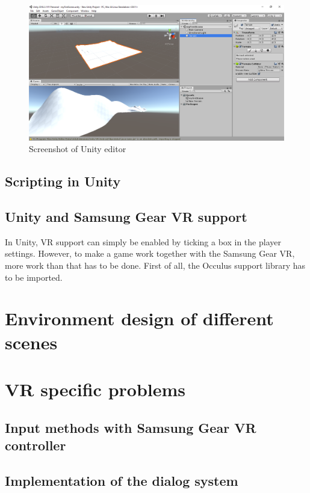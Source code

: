 \begin{figure}[h!]
  \includegraphics[width=16cm]{kapitel/editor.PNG}
  \centering
  \caption{Screenshot of Unity editor}
  \label{fig:unity-editor}
\end{figure}
\subsection{Scripting in Unity}
\subsection{Unity and Samsung Gear VR support}
In Unity, VR support can simply be enabled by ticking a box in the player settings. However, to make a game work together with the Samsung Gear VR, more work than that has to be done. First of all, the Occulus support library has to be imported.
\section{Environment design of different scenes}
\section{VR specific problems}
\subsection{Input methods with Samsung Gear VR controller}
\subsection{Implementation of the dialog system}